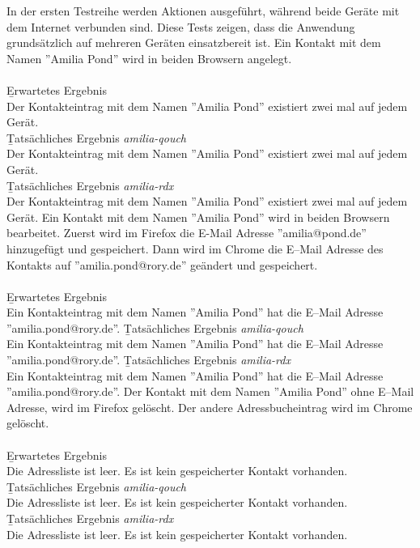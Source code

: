 In der ersten Testreihe werden Aktionen ausgeführt, während beide Geräte mit dem Internet verbunden sind.
Diese Tests zeigen, dass die Anwendung grundsätzlich auf mehreren Geräten einsatzbereit ist.
%
Ein Kontakt mit dem Namen ''Amilia Pond'' wird in beiden Browsern angelegt.\\\\
\b{Erwartetes Ergebnis}\\
Der Kontakteintrag mit dem Namen ''Amilia Pond'' existiert zwei mal auf jedem Gerät.\\
\b{Tatsächliches Ergebnis \it{amilia-qouch}}\\
Der Kontakteintrag mit dem Namen ''Amilia Pond'' existiert zwei mal auf jedem Gerät.\\
\b{Tatsächliches Ergebnis \it{amilia-rdx}}\\
Der Kontakteintrag mit dem Namen ''Amilia Pond'' existiert zwei mal auf jedem Gerät.
%
Ein Kontakt mit dem Namen ''Amilia Pond'' wird in beiden Browsern bearbeitet.
Zuerst wird im Firefox die E-Mail Adresse ''amilia@pond.de'' hinzugefügt und gespeichert.
Dann wird im Chrome die E--Mail Adresse des Kontakts auf ''amilia.pond@rory.de'' geändert und gespeichert.\\\\
\b{Erwartetes Ergebnis}\\
Ein Kontakteintrag mit dem Namen ''Amilia Pond'' hat die E--Mail Adresse ''amilia.pond@rory.de''.
\b{Tatsächliches Ergebnis \it{amilia-qouch}}\\
Ein Kontakteintrag mit dem Namen ''Amilia Pond'' hat die E--Mail Adresse ''amilia.pond@rory.de''.
\b{Tatsächliches Ergebnis \it{amilia-rdx}}\\
Ein Kontakteintrag mit dem Namen ''Amilia Pond'' hat die E--Mail Adresse ''amilia.pond@rory.de''.
%
Der Kontakt mit dem Namen ''Amilia Pond'' ohne E--Mail Adresse, wird im Firefox gelöscht. Der andere Adressbucheintrag wird im Chrome gelöscht.\\\\
\b{Erwartetes Ergebnis}\\
Die Adressliste ist leer. Es ist kein gespeicherter Kontakt vorhanden.\\
\b{Tatsächliches Ergebnis \it{amilia-qouch}}\\
Die Adressliste ist leer. Es ist kein gespeicherter Kontakt vorhanden.\\
\b{Tatsächliches Ergebnis \it{amilia-rdx}}\\
Die Adressliste ist leer. Es ist kein gespeicherter Kontakt vorhanden.